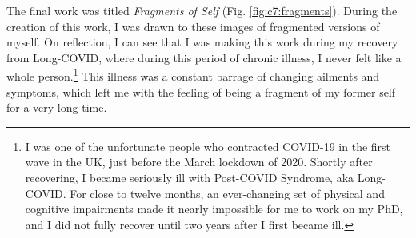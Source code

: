 The final work was titled \textit{Fragments of Self} \citeyearpar{broad2021fragments}  (Fig. \ref{fig:c7:fragments}). 
During the creation of this work, I was  drawn to these images of fragmented versions of myself. 
On reflection, I can see that I was making this work during my recovery from Long-COVID, where during this period of chronic illness, I never felt like a whole person.\footnote{
    I was one of the unfortunate people who contracted COVID-19 in the first wave in the UK, just before the March lockdown of 2020. 
    Shortly after recovering, I became seriously ill with Post-COVID Syndrome, aka Long-COVID.
    For close to twelve months, an ever-changing set of physical and cognitive impairments made it nearly impossible for me to work on my PhD, and I did not fully recover until two years after I first became ill.
} 
This illness was a constant barrage of changing ailments and symptoms, which left me with the feeling of being a fragment of my former self for a very long time.

